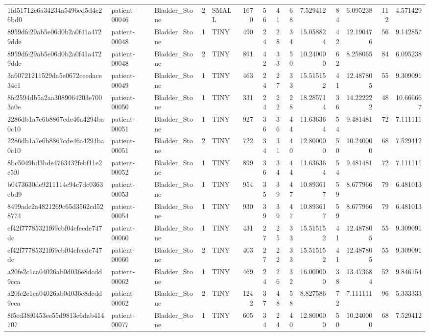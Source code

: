 \begin{tabular}{lllrlrrrrrrrrr}
1fd51712e6a34234a5496ed5d4c26bd0 & patient-00046 & Bladder_Stone & 2 & SMALL & 1670 & 56 & 41 & 68 & 7.529412 & 84 & 6.095238 & 112 & 4.571429 \\
8959dfc29ab5e06d0b2a0f41a4729dde & patient-00048 & Bladder_Stone & 1 & TINY & 490 & 24 & 28 & 34 & 15.058824 & 42 & 12.190476 & 56 & 9.142857 \\
8959dfc29ab5e06d0b2a0f41a4729dde & patient-00048 & Bladder_Stone & 2 & TINY & 891 & 42 & 33 & 50 & 10.240000 & 62 & 8.258065 & 84 & 6.095238 \\
3a60721211529da5e0672ceedace34e1 & patient-00049 & Bladder_Stone & 1 & TINY & 463 & 24 & 27 & 33 & 15.515152 & 41 & 12.487805 & 55 & 9.309091 \\
8fc2594db5a2aa3089064203e7003a0e & patient-00050 & Bladder_Stone & 1 & TINY & 331 & 24 & 22 & 28 & 18.285714 & 36 & 14.222222 & 48 & 10.666667 \\
2286db1a7e6b8867cde46a4294ba0c10 & patient-00051 & Bladder_Stone & 1 & TINY & 927 & 36 & 36 & 44 & 11.636364 & 54 & 9.481481 & 72 & 7.111111 \\
2286db1a7e6b8867cde46a4294ba0c10 & patient-00051 & Bladder_Stone & 2 & TINY & 722 & 34 & 31 & 40 & 12.800000 & 50 & 10.240000 & 68 & 7.529412 \\
8bc5049bd3bde4763432febf11e2c5f0 & patient-00052 & Bladder_Stone & 1 & TINY & 899 & 36 & 34 & 44 & 11.636364 & 54 & 9.481481 & 72 & 7.111111 \\
b0473630de9211114c94c7dc0363ebd9 & patient-00053 & Bladder_Stone & 1 & TINY & 954 & 35 & 39 & 47 & 10.893617 & 59 & 8.677966 & 79 & 6.481013 \\
8499adc2a4821269c65d3562cd528774 & patient-00054 & Bladder_Stone & 1 & TINY & 930 & 39 & 39 & 47 & 10.893617 & 59 & 8.677966 & 79 & 6.481013 \\
cf42f77785321f69cbf04efeede747dc & patient-00060 & Bladder_Stone & 1 & TINY & 431 & 27 & 25 & 33 & 15.515152 & 41 & 12.487805 & 55 & 9.309091 \\
cf42f77785321f69cbf04efeede747dc & patient-00060 & Bladder_Stone & 2 & TINY & 403 & 27 & 22 & 33 & 15.515152 & 41 & 12.487805 & 55 & 9.309091 \\
a20fe2c1ca04026ab0d036e8dcdd9cca & patient-00062 & Bladder_Stone & 1 & TINY & 469 & 24 & 26 & 32 & 16.000000 & 38 & 13.473684 & 52 & 9.846154 \\
a20fe2c1ca04026ab0d036e8dcdd9cca & patient-00062 & Bladder_Stone & 2 & TINY & 1242 & 37 & 48 & 58 & 8.827586 & 72 & 7.111111 & 96 & 5.333333 \\
8f5ed38f0453ee55d9813e6dab414707 & patient-00077 & Bladder_Stone & 1 & TINY & 605 & 34 & 24 & 40 & 12.800000 & 50 & 10.240000 & 68 & 7.529412 \\

\end{tabular}
